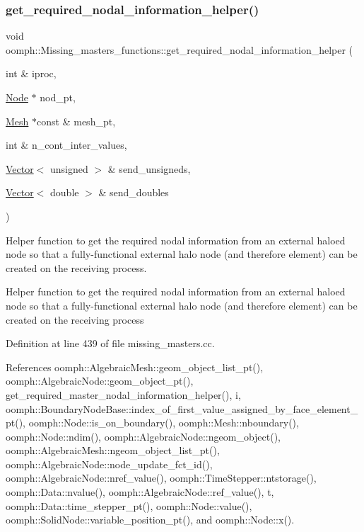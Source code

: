 \subsubsection{\texorpdfstring{get\+\_\+required\+\_\+nodal\+\_\+information\+\_\+helper()}{get\_required\_nodal\_information\_helper()}}
{\footnotesize\ttfamily void oomph\+::\+Missing\+\_\+masters\+\_\+functions\+::get\+\_\+required\+\_\+nodal\+\_\+information\+\_\+helper (\begin{DoxyParamCaption}\item[{int \&}]{iproc,  }\item[{\hyperlink{classoomph_1_1Node}{Node} $\ast$}]{nod\+\_\+pt,  }\item[{\hyperlink{classoomph_1_1Mesh}{Mesh} $\ast$const \&}]{mesh\+\_\+pt,  }\item[{int \&}]{n\+\_\+cont\+\_\+inter\+\_\+values,  }\item[{\hyperlink{classoomph_1_1Vector}{Vector}$<$ unsigned $>$ \&}]{send\+\_\+unsigneds,  }\item[{\hyperlink{classoomph_1_1Vector}{Vector}$<$ double $>$ \&}]{send\+\_\+doubles }\end{DoxyParamCaption})}



Helper function to get the required nodal information from an external haloed node so that a fully-\/functional external halo node (and therefore element) can be created on the receiving process. 

Helper function to get the required nodal information from an external haloed node so that a fully-\/functional external halo node (and therefore element) can be created on the receiving process 

Definition at line 439 of file missing\+\_\+masters.\+cc.



References oomph\+::\+Algebraic\+Mesh\+::geom\+\_\+object\+\_\+list\+\_\+pt(), oomph\+::\+Algebraic\+Node\+::geom\+\_\+object\+\_\+pt(), get\+\_\+required\+\_\+master\+\_\+nodal\+\_\+information\+\_\+helper(), i, oomph\+::\+Boundary\+Node\+Base\+::index\+\_\+of\+\_\+first\+\_\+value\+\_\+assigned\+\_\+by\+\_\+face\+\_\+element\+\_\+pt(), oomph\+::\+Node\+::is\+\_\+on\+\_\+boundary(), oomph\+::\+Mesh\+::nboundary(), oomph\+::\+Node\+::ndim(), oomph\+::\+Algebraic\+Node\+::ngeom\+\_\+object(), oomph\+::\+Algebraic\+Mesh\+::ngeom\+\_\+object\+\_\+list\+\_\+pt(), oomph\+::\+Algebraic\+Node\+::node\+\_\+update\+\_\+fct\+\_\+id(), oomph\+::\+Algebraic\+Node\+::nref\+\_\+value(), oomph\+::\+Time\+Stepper\+::ntstorage(), oomph\+::\+Data\+::nvalue(), oomph\+::\+Algebraic\+Node\+::ref\+\_\+value(), t, oomph\+::\+Data\+::time\+\_\+stepper\+\_\+pt(), oomph\+::\+Node\+::value(), oomph\+::\+Solid\+Node\+::variable\+\_\+position\+\_\+pt(), and oomph\+::\+Node\+::x().



